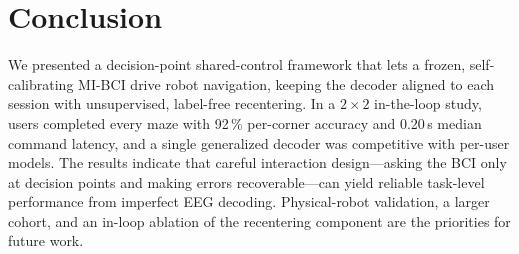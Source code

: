\documentclass[10pt,journal]{IEEEtran}
\begin{document}
\section{Conclusion}
We presented a decision-point shared-control framework that lets a frozen, self-calibrating
MI-BCI drive robot navigation, keeping the decoder aligned to each session with unsupervised,
label-free recentering. In a $2{\times}2$ in-the-loop study, users completed every maze with
92\,\% per-corner accuracy and 0.20\,s median command latency, and a single generalized decoder
was competitive with per-user models. The results indicate that careful interaction design---asking
the BCI only at decision points and making errors recoverable---can yield reliable task-level
performance from imperfect EEG decoding. Physical-robot validation, a larger cohort, and an
in-loop ablation of the recentering component are the priorities for future work.



\end{document}
